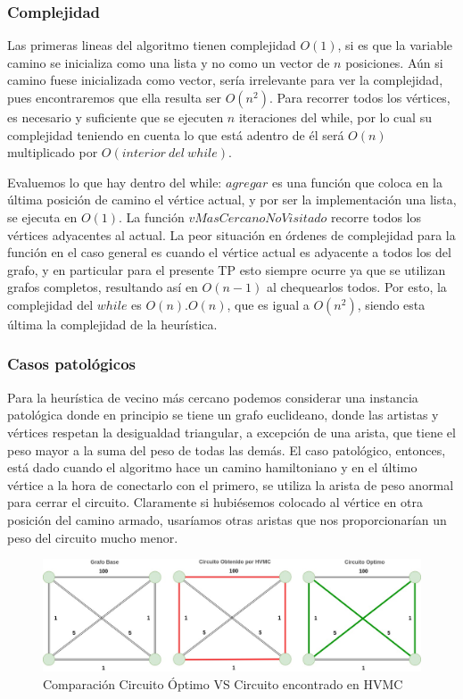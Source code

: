 \documentclass[10pt,a4paper]{article}
\begin{document}
\subsubsection{Complejidad}
Las primeras lineas del algoritmo tienen complejidad $O(1)$, si es que la variable camino se inicializa como una lista y no como un vector de $n$ posiciones. Aún si camino fuese inicializada como vector, sería irrelevante para ver la complejidad, pues encontraremos que ella resulta ser $O(n^2)$.
Para recorrer todos los vértices, es necesario y suficiente que se ejecuten $n$ iteraciones del while, por lo cual su complejidad teniendo en cuenta lo que está adentro de él será $O(n)$ multiplicado por $O(interior\ del\ while)$. 

Evaluemos lo que hay dentro del while: $agregar$ es una función que coloca en la última posición de camino el vértice actual, y por ser la implementación una lista, se ejecuta en $O(1)$. La función $vMasCercanoNoVisitado$ recorre todos los vértices adyacentes al actual. La peor situación en órdenes de complejidad para la función en el caso general es cuando el vértice actual es adyacente a todos los del grafo, y en particular para el presente TP esto siempre ocurre ya que se utilizan grafos completos, resultando así en $O(n-1)$ al chequearlos todos.
Por esto, la complejidad del $while$ es $O(n) . O(n)$, que es igual a $O(n^2)$, siendo esta última la complejidad de la heurística.

\subsubsection{Casos patológicos}

Para la heurística de vecino más cercano podemos considerar una instancia patológica donde en principio se tiene un grafo euclideano, donde las artistas y vértices respetan la desigualdad triangular, a excepción de una arista, que tiene el peso mayor a la suma del peso de todas las demás. El caso patológico, entonces, está dado cuando el algoritmo hace un camino hamiltoniano y en el último vértice a la hora de conectarlo con el primero, se utiliza la arista de peso anormal para cerrar el circuito. Claramente si hubiésemos colocado al vértice en otra posición del camino armado, usaríamos otras aristas que nos proporcionarían un peso del circuito mucho menor.

\begin{figure}[!h]
    \centering
    \captionsetup{justification=centering}
    \includegraphics[scale=0.3]{Graphs/mal caso HVMC.jpg}
    \caption{Comparación Circuito Óptimo VS Circuito encontrado en HVMC}
    \label{fig:hvma_patologico}
\end{figure}
\end{document}
